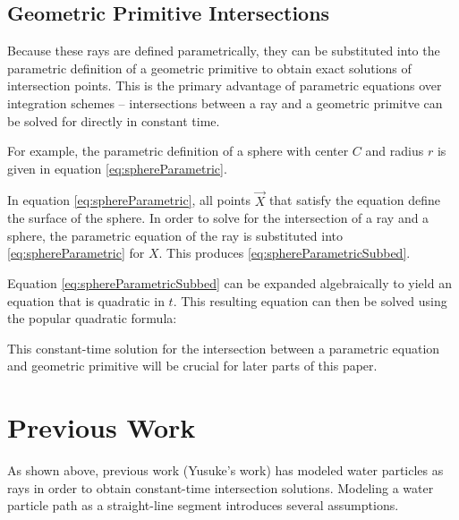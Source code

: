 	\subsection{Geometric Primitive Intersections}

Because these rays are defined parametrically, they can be substituted into the parametric definition of a geometric primitive to obtain exact solutions of intersection points. This is the primary advantage of parametric equations over integration schemes -- intersections between a ray and a geometric primitve can be solved for directly in constant time. 

For example, the parametric definition of a sphere with center $C$ and radius $r$ is given in equation \eqref{eq:sphereParametric}.

 {
	\label{eq:sphereParametric}
}

In equation \eqref{eq:sphereParametric}, all points $\vec{X}$ that satisfy the equation define the surface of the sphere. In order to solve for the intersection of a ray and a sphere, the parametric equation of the ray is substituted into \eqref{eq:sphereParametric} for $X$. This produces \eqref{eq:sphereParametricSubbed}.

 {
	\label{eq:sphereParametricSubbed}
}


Equation \eqref{eq:sphereParametricSubbed} can be expanded algebraically to yield an equation that is quadratic in $t$. This resulting equation can then be solved using the popular quadratic formula:

 {
	\label{eq:quadraticFormula}
}

This constant-time solution for the intersection between a parametric equation and geometric primitive will be crucial for later parts of this paper.

\section{Previous Work}

As shown above, previous work (Yusuke's work) has modeled water particles as rays in order to obtain constant-time intersection solutions. Modeling a water particle path as a straight-line segment introduces several assumptions.

